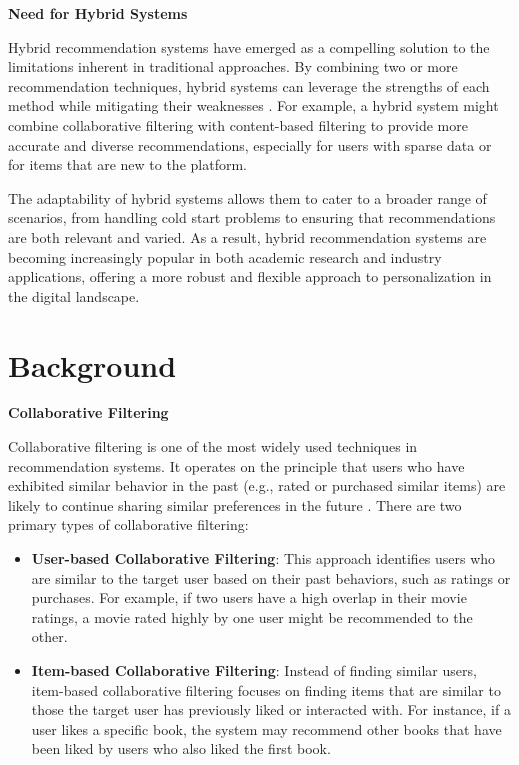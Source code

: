 \documentclass{article}
\begin{document}
\textbf{Need for Hybrid Systems}

Hybrid recommendation systems have emerged as a compelling solution to the limitations inherent in traditional approaches. By combining two or more recommendation techniques, hybrid systems can leverage the strengths of each method while mitigating their weaknesses \cite{Burke2002}. For example, a hybrid system might combine collaborative filtering with content-based filtering to provide more accurate and diverse recommendations, especially for users with sparse data or for items that are new to the platform.

The adaptability of hybrid systems allows them to cater to a broader range of scenarios, from handling cold start problems to ensuring that recommendations are both relevant and varied. As a result, hybrid recommendation systems are becoming increasingly popular in both academic research and industry applications, offering a more robust and flexible approach to personalization in the digital landscape.

\section{Background}

\textbf{Collaborative Filtering}

Collaborative filtering is one of the most widely used techniques in recommendation systems. It operates on the principle that users who have exhibited similar behavior in the past (e.g., rated or purchased similar items) are likely to continue sharing similar preferences in the future \cite{Bobadilla2013}. There are two primary types of collaborative filtering:

\begin{itemize}
    \item \textbf{User-based Collaborative Filtering}: This approach identifies users who are similar to the target user based on their past behaviors, such as ratings or purchases. For example, if two users have a high overlap in their movie ratings, a movie rated highly by one user might be recommended to the other.
    \item \textbf{Item-based Collaborative Filtering}: Instead of finding similar users, item-based collaborative filtering focuses on finding items that are similar to those the target user has previously liked or interacted with. For instance, if a user likes a specific book, the system may recommend other books that have been liked by users who also liked the first book.
\end{itemize}
\end{document}
